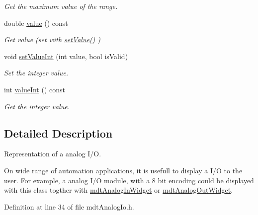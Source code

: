 \begin{DoxyCompactItemize}
\begin{DoxyCompactList}\small\item\em Get the maximum value of the range. \end{DoxyCompactList}\item 
\hypertarget{classmdt_analog_io_a55d3e346dd13a580dc4ac77e8e946b01}{
double \hyperlink{classmdt_analog_io_a55d3e346dd13a580dc4ac77e8e946b01}{value} () const }
\label{classmdt_analog_io_a55d3e346dd13a580dc4ac77e8e946b01}

\begin{DoxyCompactList}\small\item\em Get value (set with \hyperlink{classmdt_analog_io_aefdee4a9c33e5939f8ee7d599c959567}{setValue()} ) \end{DoxyCompactList}\item 
void \hyperlink{classmdt_analog_io_a867ced0c700cf2a4a72c1fa110364235}{setValueInt} (int value, bool isValid)
\begin{DoxyCompactList}\small\item\em Set the integer value. \end{DoxyCompactList}\item 
int \hyperlink{classmdt_analog_io_a7594e94e059dd3b1db9d8277c7426fb2}{valueInt} () const 
\begin{DoxyCompactList}\small\item\em Get the integer value. \end{DoxyCompactList}\end{DoxyCompactItemize}


\subsection{Detailed Description}
Representation of a analog I/O. 

On wide range of automation applications, it is usefull to display a I/O to the user. For example, a analog I/O module, with a 8 bit encoding could be displayed with this class togther with \hyperlink{classmdt_analog_in_widget}{mdtAnalogInWidget} or \hyperlink{classmdt_analog_out_widget}{mdtAnalogOutWidget}. 

Definition at line 34 of file mdtAnalogIo.h.



